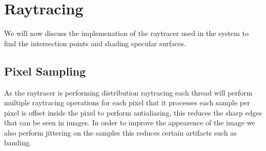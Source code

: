 \section{Raytracing}
We will now discuss the implemenation of the raytracer used in the system to find the intersection points and shading specular
surfaces.

\subsection{Pixel Sampling}
As the raytracer is performing distribution raytracing each thread will perform multiple raytracing operations for each pixel
that it processes each sample per pixel is offset inside the pixel to perform antialiasing, this reduces the sharp edges that
can be seen in images. In order to improve the appearence of the image we also perform jittering on the samples this reduces
certain artifacts such as banding. 

